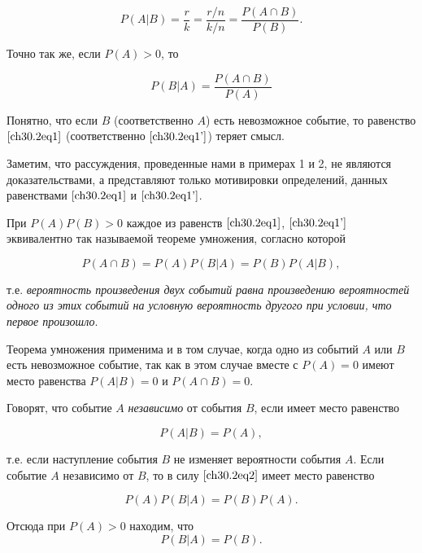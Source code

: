 \begin{equation} \label{ch30.2eq1}
P(A|B) = \frac{r}{k} = \frac{r/n}{k/n} = \frac{P(A\cap B)}{P(B)}.
\end{equation}

Точно так же, если $P(A) > 0$, то

\begin{equation} \label{ch30.2eq1'}
P(B|A) = \frac{P(A\cap B)}{P(A)}
\end{equation}

Понятно, что если $B$ (соответственно $A$) есть невозможное событие, то равенство $\eqref{ch30.2eq1}$ (соответственно $\eqref{ch30.2eq1'}$) теряет смысл.

Заметим, что рассуждения, проведенные нами в примерах 1 и 2, не являются доказательствами, а представляют только мотивировки определений, данных равенствами $\eqref{ch30.2eq1}$ и $\eqref{ch30.2eq1'}$.

При $P(A)P(B) > 0$ каждое из равенств $\eqref{ch30.2eq1}$, $\eqref{ch30.2eq1'}$  эквивалентно так называемой теореме умножения, согласно которой

\begin{equation} \label{ch30.2eq2}
P(A\cap B) = P(A)P(B|A) = P(B)P(A|B),
\end{equation}

т.е. \textit{вероятность произведения двух событий равна произведению вероятностей одного из этих событий на условную вероятность другого при условии, что первое произошло}.

Теорема умножения применима и в том случае, когда одно из событий $A$ или $B$ есть невозможное событие, так как в этом случае вместе с $P(A) = 0$ имеют место равенства $P(A|B) = 0$ и $P(A\cap B) = 0$.

Говорят, что событие $A$ \textit{независимо} от события $B$, если имеет место равенство

\begin{equation} \label{ch30.2eq3}
P(A|B) = P(A),
\end{equation}

т.е. если наступление события $B$ не изменяет вероятности события $A$. Если событие $A$ независимо от $B$, то в силу $\eqref{ch30.2eq2}$ имеет место равенство

$$
P(A)P(B|A) = P(B)P(A).
$$

Отсюда при $P(A) > 0$ находим, что
\begin{equation} \label{ch30.2eq4}
P(B|A) = P(B).
\end{equation}

